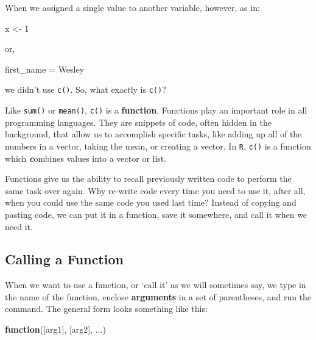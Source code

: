 \documentclass[
]{book}
\newenvironment{Shaded}{\begin{snugshade}}{\end{snugshade}}
\newcommand{\ControlFlowTok}[1]{\textcolor[rgb]{0.13,0.29,0.53}{\textbf{#1}}}
\newcommand{\DecValTok}[1]{\textcolor[rgb]{0.00,0.00,0.81}{#1}}
\newcommand{\NormalTok}[1]{#1}
\newcommand{\OtherTok}[1]{\textcolor[rgb]{0.56,0.35,0.01}{#1}}
\newcommand{\StringTok}[1]{\textcolor[rgb]{0.31,0.60,0.02}{#1}}
\begin{document}
When we assigned a single value to another variable, however, as in:

\begin{Shaded}
\begin{Highlighting}[]
\NormalTok{x }\OtherTok{\textless{}{-}} \DecValTok{1}
\end{Highlighting}
\end{Shaded}

or,

\begin{Shaded}
\begin{Highlighting}[]
\NormalTok{first\_name }\OtherTok{=} \StringTok{\textquotesingle{}Wesley\textquotesingle{}}
\end{Highlighting}
\end{Shaded}

we didn't use \texttt{c()}. So, what exactly is \texttt{c()}?

Like \texttt{sum()} or \texttt{mean()}, \texttt{c()} is a \textbf{function}. Functions play an important role in all programming languages. They are snippets of code, often hidden in the background, that allow us to accomplish specific tasks, like adding up all of the numbers in a vector, taking the mean, or creating a vector. In \texttt{R}, \texttt{c()} is a function which \textbf{\emph{c}}ombines values into a vector or list.

Functions give us the ability to recall previously written code to perform the same task over again. Why re-write code every time you need to use it, after all, when you could use the same code you used last time? Instead of copying and pasting code, we can put it in a function, save it somewhere, and call it when we need it.

\hypertarget{calling-a-function}{%
\subsection{Calling a Function}\label{calling-a-function}}

When we want to use a function, or `call it' as we will sometimes say, we type in the name of the function, enclose \textbf{arguments} in a set of parentheses, and run the command. The general form looks something like this:

\begin{Shaded}
\begin{Highlighting}[]
\ControlFlowTok{function}\NormalTok{([arg1], [arg2], ...)}
\end{Highlighting}
\end{Shaded}
\end{document}
